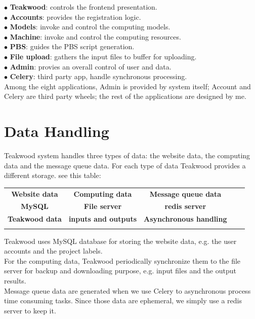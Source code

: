 $\bullet$ \textbf{Teakwood}: controls the frontend presentation.\\
$\bullet$ \textbf{Accounts}: provides the registration logic.\\
$\bullet$ \textbf{Models}: invoke and control the computing models.\\
$\bullet$ \textbf{Machine}: invoke and control the computing resources.\\
$\bullet$ \textbf{PBS}: guides the PBS script generation.\\
$\bullet$ \textbf{File upload}: gathers the input files to buffer for uploading. \\
$\bullet$ \textbf{Admin}: provies an overall control of user and data.\\
$\bullet$ \textbf{Celery}: third party app, handle synchronous processing.\\

Among the eight applications, Admin is provided by system itself;  Account and Celery are third party wheels; the rest of the applications are designed by me. 
\section{Data Handling}
Teakwood system handles three types of data: the website data, the computing data and the message queue data. For each type of data Teakwood provides a different storage. see this table:\\
\begin{table}[h]
\begin{tabular}{lllll}
\cline{1-3}
\multicolumn{1}{|c|}{\textbf{Website data}} & \multicolumn{1}{c|}{\textbf{Computing data}} & \multicolumn{1}{c|}{\textbf{Message queue data}} &  &  \\ \cline{1-3}
\multicolumn{1}{|c|}{\textbf{MySQL}} & \multicolumn{1}{c|}{\textbf{File server}} & \multicolumn{1}{c|}{\textbf{redis server}} &  &  \\ \cline{1-3}
\multicolumn{1}{|c|}{\textbf{Teakwood data}} & \multicolumn{1}{c|}{\textbf{inputs and outputs}} & \multicolumn{1}{c|}{\textbf{Asynchronous handling}} &  &  \\ \cline{1-3}
                                &                                &                                &  & 
\end{tabular}
\end{table}

Teakwood uses MySQL database for storing the website data, e.g. the user accounts and the project labels.\\
For the computing data, Teakwood periodically synchronize them to the file server for backup and downloading purpose, e.g. input files and the output results.\\
Message queue data are generated when we use Celery to asynchronous process time consuming tasks. Since those data are ephemeral, we simply use a redis server to keep it.\\

